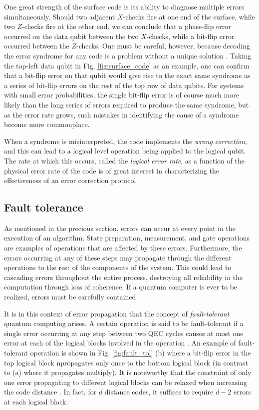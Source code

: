 One great strength of the surface code is its ability to diagnose multiple
errors simultaneously. Should two adjacent $X$-checks fire at one end of the
surface, while two $Z$-checks fire at the other end, we can conclude that a
phase-flip error occurred on the data qubit between the two $X$-checks, while a
bit-flip error occurred between the $Z$-checks. One must be careful, however,
because decoding the error syndrome for any code is a problem without a unique
solution \cite{terhal15}. Taking the top-left data qubit in Fig. \ref{fig:surface_code} as an
example, one can confirm that a bit-flip error on that qubit would give rise to
the exact same syndrome as a series of bit-flip errors on the rest of the top
row of data qubits. For systems with small error probabilities, the single
bit-flip error is of course much more likely than the long series of errors
required to produce the same syndrome, but as the error rate grows, such
mistakes in identifying the cause of a syndrome become more commonplace. 

When a syndrome is misinterpreted, the code implements the \textit{wrong
  correction}, and this can lead to a logical level operation being applied to
the logical qubit. The rate at which this occurs, called the \textit{logical
  error rate}, as a function of the physical error rate of the code is of great
interest in characterizing the effectiveness of an error correction protocol.

\subsection{Fault tolerance}
As mentioned in the precious section, errors can occur at every point in the
execution of an algorithm. State preparation, measurement, and gate operations
are examples of operations that are affected by these errors. Furthermore, the
errors occurring at any of these steps may propagate through the different
operations to the rest of the components of the system. This could lead to
cascading errors throughout the entire process, destroying all reliability in
the computation through loss of coherence. If a quantum computer is ever to be
realized, errors must be carefully contained.

It is in this context of error propagation that the concept of
\textit{fault-tolerant} quantum computing arises. A certain operation is said to
be fault-tolerant if a single error occurring at any step between two QEC cycles
causes at most one error at each of the logical blocks involved in the operation
\cite{Devitt_2013}. An example of fault-tolerant operation is shown in Fig.
\ref{fig:fault_tol} (b) where a bit-flip error in the top logical block
npropagates only once to the bottom logical block (in contrast to (a) where it
propagates multiply). It is noteworthy that the constraint of only one
error propagating to different logical blocks can be relaxed when increasing the
code distance \cite{Devitt_2013}. In fact, for $d$ distance codes, it suffices
to require $d-2$ errors at each logical block.

